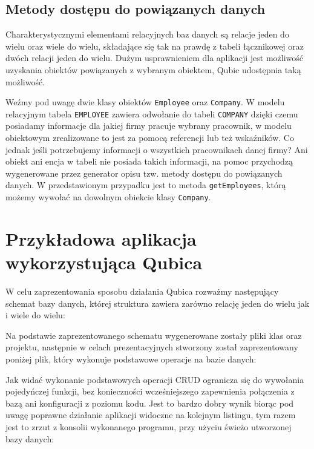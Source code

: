 \documentclass[12pt]{report}
\begin{document}


\subsection{Metody dostępu do powiązanych danych}

Charakterystycznymi elementami relacyjnych baz danych są relacje jeden do wielu oraz wiele do wielu, składające się tak na prawdę z tabeli łącznikowej oraz dwóch relacji
jeden do wielu. Dużym usprawnieniem dla aplikacji jest możliwość uzyskania obiektów powiązanych z wybranym obiektem, Qubic udostępnia taką możliwość.

Weźmy pod uwagę dwie klasy obiektów {\tt Employee} oraz {\tt Company}. W modelu relacyjnym tabela {\tt EMPLOYEE} zawiera odwołanie do tabeli {\tt COMPANY} dzięki
czemu posiadamy informacje dla jakiej firmy pracuje wybrany pracownik, w modelu obiektowym zrealizowane to jest za pomocą referencji lub też wskaźników. Co jednak jeśli
potrzebujemy informacji o wszystkich pracownikach danej firmy? Ani obiekt ani encja w tabeli nie posiada takich informacji, na pomoc przychodzą wygenerowane przez
generator opisu tzw. metody dostępu do powiązanych danych. W przedstawionym przypadku jest to metoda {\tt getEmployees}, którą możemy wywołać na dowolnym obiekcie
klasy {\tt Company}.

\section{Przykładowa aplikacja wykorzystująca Qubica}

W celu zaprezentowania sposobu działania Qubica rozważmy następujący schemat bazy danych, której struktura zawiera zarówno relację jeden do wielu jak i wiele do wielu:



Na podstawie zaprezentowanego schematu wygenerowane zostały pliki klas oraz projektu, następnie w celach prezentacyjnych stworzony został zaprezentowany poniżej
plik, który wykonuje podstawowe operacje na bazie danych:

\newpage



Jak widać wykonanie podstawowych operacji CRUD ogranicza się do wywołania pojedyńczej funkcji, bez konieczności wcześniejszego zapewnienia połączenia z bazą ani
konfiguracji z poziomu kodu. Jest to bardzo dobry wynik biorąc pod uwagę poprawne działanie aplikacji widoczne na kolejnym listingu, tym razem jest to zrzut z konsolii
wykonanego programu, przy użyciu świeżo utworzonej bazy danych:
\end{document}
